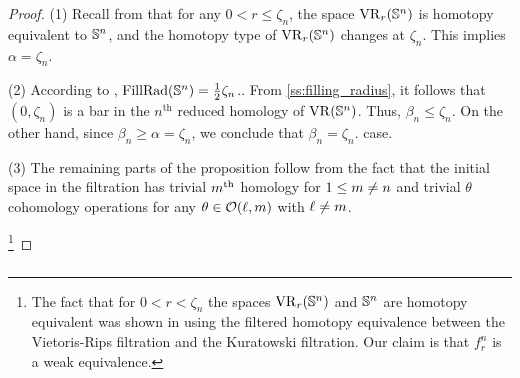 \begin{proof}
	(1) Recall from \cite[Thm.~7.1]{lim2020vietoris} that for any $0 < r \leq \zeta_n$, the space $\operatorname{VR}_r(\mathbb{S}^n)$ is homotopy equivalent to $\mathbb{S}^n$, and the homotopy type of $\operatorname{VR}_r(\mathbb{S}^n)$ changes at $\zeta_n$.
	This implies $\alpha=\zeta_n$.

	(2) According to \cite{katz1983filling}, \(\mathrm{FillRad}(\mathbb{S}^n) = \frac{1}{2}\zeta_n\)..
	From \cref{ss:filling_radius}, it follows that \((0, \zeta_n)\) is a bar in the \(n^{\text{th}}\) reduced homology of \(\operatorname{VR} (\mathbb{S}^n)\).
	Thus, \(\beta_n \leq \zeta_n\).
	On the other hand, since \(\beta_n \geq \alpha = \zeta_n\), we conclude that \(\beta_n = \zeta_n\). case.


	(3) The remaining parts of the proposition follow from the fact that the initial space in the filtration has trivial $m^{\mathrm{th}}$ homology for $1\leq m \neq n$ and trivial $\theta$ cohomology operations for any \(\theta \in \mathcal{O}(\ell,m)\) with \(\ell \neq m\).

	\footnote{The fact that for $0 < r < \zeta_n$ the spaces $\operatorname{VR}_r(\mathbb{S}^n)$ and $\mathbb{S}^n$ are homotopy equivalent was shown in \cite[Theorem 7.1]{lim2020vietoris} using the filtered homotopy equivalence between the Vietoris-Rips filtration and the Kuratowski filtration. Our claim is that $f_r^n$ is a weak equivalence.}
\end{proof}

\subsubsection{}\label{ss:VRSn projection}

